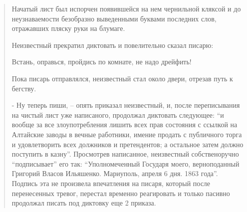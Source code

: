 \begin{quote}
Начатый лист был испорчен появившейся на нем чернильной кляксой и до
неузнаваемости безобразно выведенными буквами последних слов, отражавших пляску
руки на блумаге.

Неизвестный прекратил диктовать и повелительно сказал писарю:

Встань, оправься, пройдись по комнате, не надо дрейфить!

Пока писарь отправлялся, неизвестный стал около двери, отрезав путь к бегству.

- Ну теперь пиши, – опять приказал неизвестный, и, после переписывания на
чистый лист уже написаного, продолжал диктовать следующее: \enquote{и вообще за все
злоупотребления лишить всех прав состояния с ссылкой на Алтайские заводы в
вечные работники, имение продать с публичного торга и удовлетворить всех
должников и претендентов; а остальное затем должно поступить в казну}.
Просмотрев написанное, неизвестный собственоручно \enquote{подписывает} его так:
\enquote{Уполномеченный Государя моего, верноподанный Григорий Власов Ильяшенко.
Мариуполь, апреля 6 дня. 1863 года}. Подпись эта не произвела впечатления на
писаря, который после перенесенных тревог, перестал временно реагировать и
только пасивно продолжал писать под диктовку еще 2 приказа.

\end{quote}

